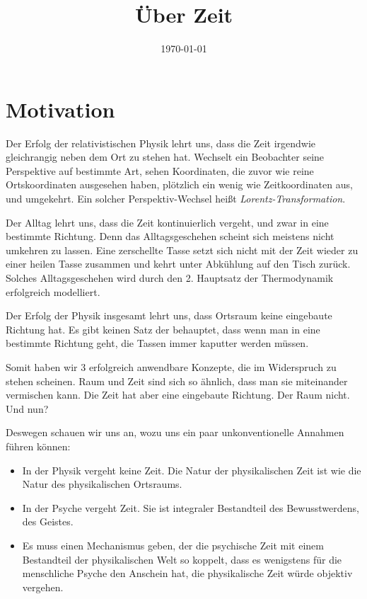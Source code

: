 \documentclass[12pt]{article}
\begin{document}
\title{\fontsize{40}{40}\selectfont \textbf{Über Zeit}}
\date{\today}
\maketitle



\section{Motivation}

Der Erfolg der relativistischen Physik lehrt uns, dass die Zeit irgendwie gleichrangig neben dem Ort zu stehen hat. Wechselt ein Beobachter seine Perspektive auf bestimmte Art, sehen  Koordinaten, die zuvor wie reine Ortskoordinaten ausgesehen haben, plötzlich ein wenig wie Zeitkoordinaten aus, und umgekehrt. Ein solcher Perspektiv-Wechsel heißt \emph{Lorentz-Transformation}. 

Der Alltag lehrt uns, dass die Zeit kontinuierlich vergeht, und zwar in eine bestimmte Richtung. Denn das Alltagsgeschehen scheint sich meistens nicht umkehren zu lassen. Eine zerschellte Tasse setzt sich nicht mit der Zeit wieder zu einer heilen Tasse zusammen und kehrt unter Abkühlung auf den Tisch zurück. Solches Alltagsgeschehen wird durch den 2. Hauptsatz der Thermodynamik erfolgreich modelliert.

Der Erfolg der Physik insgesamt lehrt uns, dass Ortsraum keine eingebaute Richtung hat. Es gibt keinen Satz der behauptet, dass wenn man in eine bestimmte Richtung geht, die Tassen immer kaputter werden müssen.

Somit haben wir 3 erfolgreich anwendbare Konzepte, die im Widerspruch zu stehen scheinen. Raum und Zeit sind sich so ähnlich, dass man sie miteinander vermischen kann. Die Zeit hat aber eine eingebaute Richtung. Der Raum nicht. Und nun?

Deswegen schauen wir uns an, wozu uns ein paar unkonventionelle Annahmen führen können:

\begin{itemize}
\item In der Physik vergeht keine Zeit. Die Natur der physikalischen Zeit ist wie die Natur des physikalischen Ortsraums.
\item In der Psyche vergeht Zeit. Sie ist integraler Bestandteil des Bewusstwerdens, des Geistes. 
\item Es muss einen Mechanismus geben, der die psychische Zeit mit einem Bestandteil der physikalischen Welt so koppelt, dass es wenigstens für die menschliche Psyche den Anschein hat, die physikalische Zeit würde objektiv vergehen.
\end{itemize}
\end{document}
